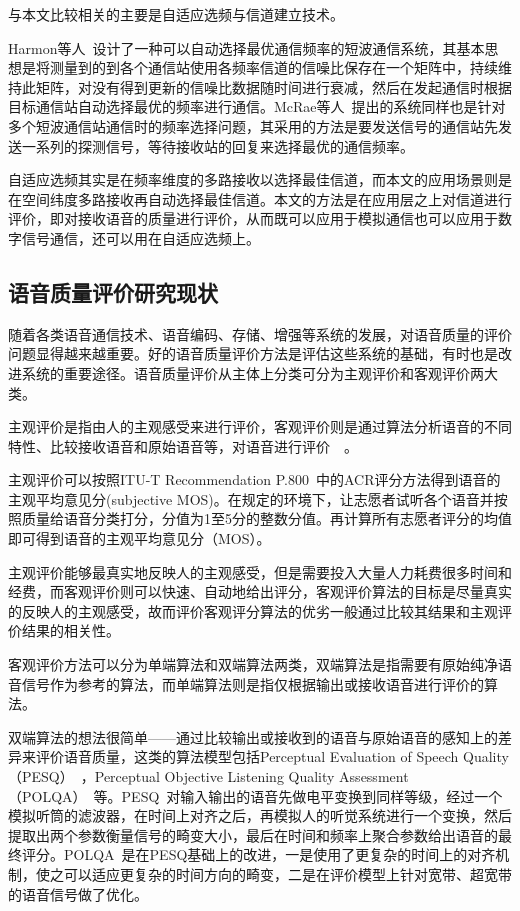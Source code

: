 与本文比较相关的主要是自适应选频与信道建立技术。

Harmon等人~\cite{harmon1982adaptive}设计了一种可以自动选择最优通信频率的短波通信系统，其基本思想是将测量到的到各个通信站使用各频率信道的信噪比保存在一个矩阵中，持续维持此矩阵，对没有得到更新的信噪比数据随时间进行衰减，然后在发起通信时根据目标通信站自动选择最优的频率进行通信。McRae等人~\cite{mcrae1989frequency}提出的系统同样也是针对多个短波通信站通信时的频率选择问题，其采用的方法是要发送信号的通信站先发送一系列的探测信号，等待接收站的回复来选择最优的通信频率。

自适应选频其实是在频率维度的多路接收以选择最佳信道，而本文的应用场景则是在空间纬度多路接收再自动选择最佳信道。本文的方法是在应用层之上对信道进行评价，即对接收语音的质量进行评价，从而既可以应用于模拟通信也可以应用于数字信号通信，还可以用在自适应选频上。

\subsection{语音质量评价研究现状}

随着各类语音通信技术、语音编码、存储、增强等系统的发展，对语音质量的评价问题显得越来越重要。好的语音质量评价方法是评估这些系统的基础，有时也是改进系统的重要途径。语音质量评价从主体上分类可分为主观评价和客观评价两大类。

主观评价是指由人的主观感受来进行评价，客观评价则是通过算法分析语音的不同特性、比较接收语音和原始语音等，对语音进行评价~\cite{肖累累2013语音质量客观评价方法的研究}~\cite{moller2011speech}。

主观评价可以按照ITU-T Recommendation P.800~\cite{rec1996p}中的ACR评分方法得到语音的主观平均意见分(subjective MOS)。在规定的环境下，让志愿者试听各个语音并按照质量给语音分类打分，分值为1至5分的整数分值。再计算所有志愿者评分的均值即可得到语音的主观平均意见分（MOS）。

主观评价能够最真实地反映人的主观感受，但是需要投入大量人力耗费很多时间和经费，而客观评价则可以快速、自动地给出评分，客观评价算法的目标是尽量真实的反映人的主观感受，故而评价客观评分算法的优劣一般通过比较其结果和主观评价结果的相关性。

客观评价方法可以分为单端算法和双端算法两类，双端算法是指需要有原始纯净语音信号作为参考的算法，而单端算法则是指仅根据输出或接收语音进行评价的算法。

双端算法的想法很简单——通过比较输出或接收到的语音与原始语音的感知上的差异来评价语音质量，这类的算法模型包括Perceptual Evaluation of Speech Quality（PESQ）~\cite{recommendation2001perceptual}，Perceptual Objective Listening Quality Assessment（POLQA）~\cite{rec2011p}等。PESQ~\cite{recommendation2001perceptual}对输入输出的语音先做电平变换到同样等级，经过一个模拟听筒的滤波器，在时间上对齐之后，再模拟人的听觉系统进行一个变换，然后提取出两个参数衡量信号的畸变大小，最后在时间和频率上聚合参数给出语音的最终评分。POLQA~\cite{rec2011p}是在PESQ基础上的改进，一是使用了更复杂的时间上的对齐机制，使之可以适应更复杂的时间方向的畸变，二是在评价模型上针对宽带、超宽带的语音信号做了优化。

